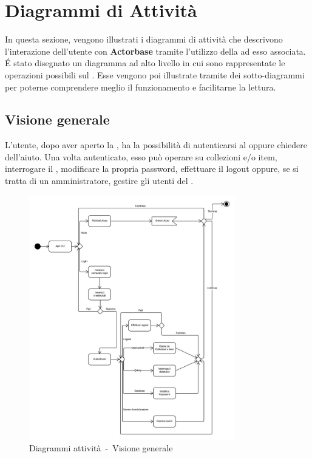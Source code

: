 \documentclass{scalatekids-article}
\begin{document}
\section{Diagrammi di Attività}

In questa sezione, vengono illustrati i diagrammi di attività che descrivono
l'interazione dell'utente con \textbf{Actorbase} tramite l'utilizzo della 
ad esso associata.  É stato disegnato un diagramma ad alto livello in cui sono
rappresentate le operazioni possibili sul . Esse vengono poi
illustrate tramite dei sotto-diagrammi per poterne comprendere meglio il
funzionamento e facilitarne la lettura.

\subsection{Visione generale}

L'utente, dopo aver aperto la , ha la possibilità di autenticarsi
al  oppure chiedere dell'aiuto. Una volta autenticato, esso può
operare su collezioni e/o item, interrogare il , modificare la propria
password, effettuare il logout oppure, se si tratta di un amministratore,
gestire gli utenti del .

\begin{figure}[H]
  \begin{center}
    \includegraphics[width=0.8\textwidth, keepaspectratio]{img/diagrammiAttivita/visioneGenerale.jpeg}
    \caption{Diagrammi attività\ -\ Visione generale}
  \end{center}
\end{figure}
\end{document}
